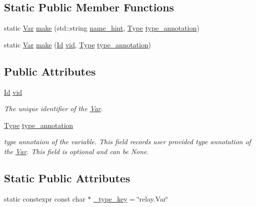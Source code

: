 \subsection*{Static Public Member Functions}
\begin{DoxyCompactItemize}
\item 
static \hyperlink{classtvm_1_1relay_1_1Var}{Var} \hyperlink{classtvm_1_1relay_1_1VarNode_aa2051e62113c0479c948a2f191ab09f1}{make} (std\+::string \hyperlink{classtvm_1_1relay_1_1VarNode_aa9a3d5f1c750ab4e34f23bf21daeb53d}{name\+\_\+hint}, \hyperlink{namespacetvm_1_1relay_a661d95f170bca230773914caeef3fe52}{Type} \hyperlink{classtvm_1_1relay_1_1VarNode_a79a56885eaf2a9326ff490164a5c1f0e}{type\+\_\+annotation})
\item 
static \hyperlink{classtvm_1_1relay_1_1Var}{Var} \hyperlink{classtvm_1_1relay_1_1VarNode_a3db693e18bb0da26eb51d6d71e12f419}{make} (\hyperlink{classtvm_1_1relay_1_1Id}{Id} \hyperlink{classtvm_1_1relay_1_1VarNode_af191a8eedf3575d626771c9c820ddb63}{vid}, \hyperlink{namespacetvm_1_1relay_a661d95f170bca230773914caeef3fe52}{Type} \hyperlink{classtvm_1_1relay_1_1VarNode_a79a56885eaf2a9326ff490164a5c1f0e}{type\+\_\+annotation})
\end{DoxyCompactItemize}
\subsection*{Public Attributes}
\begin{DoxyCompactItemize}
\item 
\hyperlink{classtvm_1_1relay_1_1Id}{Id} \hyperlink{classtvm_1_1relay_1_1VarNode_af191a8eedf3575d626771c9c820ddb63}{vid}
\begin{DoxyCompactList}\small\item\em The unique identifier of the \hyperlink{classtvm_1_1relay_1_1Var}{Var}. \end{DoxyCompactList}\item 
\hyperlink{namespacetvm_1_1relay_a661d95f170bca230773914caeef3fe52}{Type} \hyperlink{classtvm_1_1relay_1_1VarNode_a79a56885eaf2a9326ff490164a5c1f0e}{type\+\_\+annotation}
\begin{DoxyCompactList}\small\item\em type annotaion of the variable. This field records user provided type annotation of the \hyperlink{classtvm_1_1relay_1_1Var}{Var}. This field is optional and can be None. \end{DoxyCompactList}\end{DoxyCompactItemize}
\subsection*{Static Public Attributes}
\begin{DoxyCompactItemize}
\item 
static constexpr const char $\ast$ \hyperlink{classtvm_1_1relay_1_1VarNode_a8f636ca6173977176ebee6fed7820669}{\+\_\+type\+\_\+key} = \char`\"{}relay.\+Var\char`\"{}
\end{DoxyCompactItemize}


